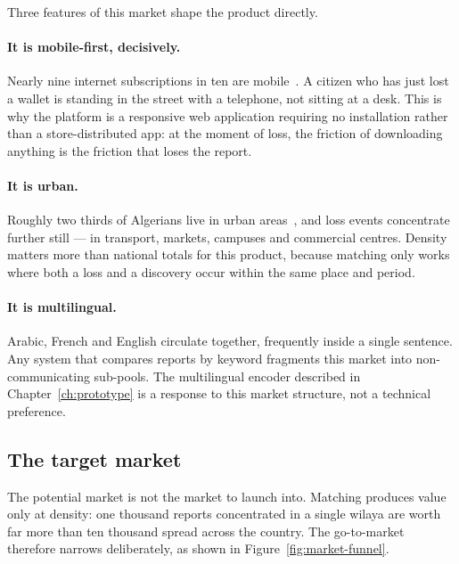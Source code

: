 Three features of this market shape the product directly.

\paragraph{It is mobile-first, decisively.} Nearly nine internet subscriptions
in ten are mobile~\cite{arpce2025}. A citizen who has just lost a wallet is
standing in the street with a telephone, not sitting at a desk. This is why the
platform is a responsive web application requiring no installation rather than a
store-distributed app: at the moment of loss, the friction of downloading
anything is the friction that loses the report.

\paragraph{It is urban.} Roughly two thirds of Algerians live in urban
areas~\cite{macrotrends2025}, and loss events concentrate further still --- in
transport, markets, campuses and commercial centres. Density matters more than
national totals for this product, because matching only works where both a loss
and a discovery occur within the same place and period.

\paragraph{It is multilingual.} Arabic, French and English circulate together,
frequently inside a single sentence. Any system that compares reports by
keyword fragments this market into non-communicating sub-pools. The multilingual
encoder described in Chapter~\ref{ch:prototype} is a response to this market
structure, not a technical preference.

\subsection{The target market}

The potential market is not the market to launch into. Matching produces value
only at density: one thousand reports concentrated in a single wilaya are worth
far more than ten thousand spread across the country. The go-to-market therefore
narrows deliberately, as shown in Figure~\ref{fig:market-funnel}.

